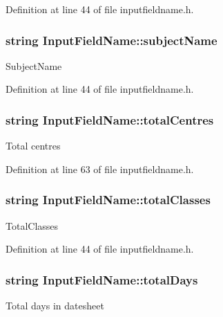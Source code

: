 \-Definition at line 44 of file inputfieldname.\-h.

\hypertarget{classInputFieldName_a0614731b959afef6bb00f9fc957e7521}{
\subsubsection[{subject\-Name}]{\setlength{\rightskip}{0pt plus 5cm}string {\bf \-Input\-Field\-Name\-::subject\-Name}}}\label{classInputFieldName_a0614731b959afef6bb00f9fc957e7521}
\-Subject\-Name 

\-Definition at line 44 of file inputfieldname.\-h.

\hypertarget{classInputFieldName_af88ac102ec3a4adbb9edc7c3d61919cb}{
\subsubsection[{total\-Centres}]{\setlength{\rightskip}{0pt plus 5cm}string {\bf \-Input\-Field\-Name\-::total\-Centres}}}\label{classInputFieldName_af88ac102ec3a4adbb9edc7c3d61919cb}
\-Total centres 

\-Definition at line 63 of file inputfieldname.\-h.

\hypertarget{classInputFieldName_a5bf413dee6dcf29c1872e93f150d48c0}{
\subsubsection[{total\-Classes}]{\setlength{\rightskip}{0pt plus 5cm}string {\bf \-Input\-Field\-Name\-::total\-Classes}}}\label{classInputFieldName_a5bf413dee6dcf29c1872e93f150d48c0}
\-Total\-Classes 

\-Definition at line 44 of file inputfieldname.\-h.

\hypertarget{classInputFieldName_a12ba65660edd7f8f7ecf1e25893716da}{
\subsubsection[{total\-Days}]{\setlength{\rightskip}{0pt plus 5cm}string {\bf \-Input\-Field\-Name\-::total\-Days}}}\label{classInputFieldName_a12ba65660edd7f8f7ecf1e25893716da}
\-Total days in datesheet 

